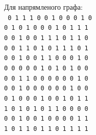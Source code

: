 \begin{minipage}[t]{0.4\linewidth}
  \begin{center}
    \begin{framed}
      \noindent%
      Для напрямленого графа:\\
      \footnotesize\texttt{%
        0 1 1 1 0 0 1 0 0 0 1 0\\
        0 1 0 1 0 0 0 1 0 1 1 1\\
        0 0 1 0 0 1 1 1 0 1 1 0\\
        0 0 1 1 0 1 0 1 1 1 0 1\\
        0 0 1 0 0 1 1 0 0 0 1 0\\
        0 0 0 0 0 1 0 1 0 1 0 0\\
        0 0 1 1 0 0 0 0 0 0 1 0\\
        0 0 1 0 0 0 0 0 0 1 0 0\\
        0 1 0 0 0 1 0 0 1 0 1 1\\
        1 0 1 0 1 0 1 1 0 0 0 0\\
        0 0 1 0 0 1 0 0 0 0 1 1\\
        1 0 1 1 0 1 1 0 1 1 1 1\\
      }
    \end{framed}
  \end{center}
\end{minipage}
\hfill
